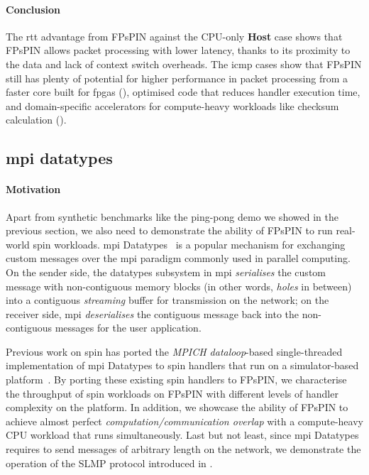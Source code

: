 \paragraph{Conclusion} The \ac{rtt} advantage from FPsPIN against the CPU-only \textbf{Host} case shows that FPsPIN allows packet processing with lower latency, thanks to its proximity to the data and lack of context switch overheads.  The \ac{icmp} cases show that FPsPIN still has plenty of potential for higher performance in packet processing from a faster core built for \ac{fpga}s (), optimised code that reduces handler execution time, and domain-specific accelerators for compute-heavy workloads like checksum calculation ().

\subsection{\acs{mpi} datatypes} \label{sec:mpi-datatypes-demo}

\paragraph{Motivation} Apart from synthetic benchmarks like the ping-pong demo we showed in the previous section, we also need to demonstrate the ability of FPsPIN to run real-world \ac{spin} workloads.  \Ac{mpi} Datatypes~\cite{pierce_types_2002} is a popular mechanism for exchanging custom messages over the \ac{mpi} paradigm commonly used in parallel computing.  On the sender side, the datatypes subsystem in \ac{mpi} \emph{serialises} the custom message with non-contiguous memory blocks (in other words, \emph{holes} in between) into a contiguous \emph{streaming} buffer for transmission on the network; on the receiver side, \ac{mpi} \emph{deserialises} the contiguous message back into the non-contiguous messages for the user application.

Previous work on \ac{spin} has ported the \emph{MPICH dataloop}-based single-threaded implementation of \ac{mpi} Datatypes to \ac{spin} handlers that run on a simulator-based platform~\cite{di_girolamo_network-accelerated_2019}.  By porting these existing \ac{spin} handlers to FPsPIN, we characterise the throughput of \ac{spin} workloads on FPsPIN with different levels of handler complexity on the platform.  In addition, we showcase the ability of FPsPIN to achieve almost perfect \emph{computation/communication overlap} with a compute-heavy CPU workload that runs simultaneously.  Last but not least, since \ac{mpi} Datatypes requires to send messages of arbitrary length on the network, we demonstrate the operation of the SLMP protocol introduced in .

